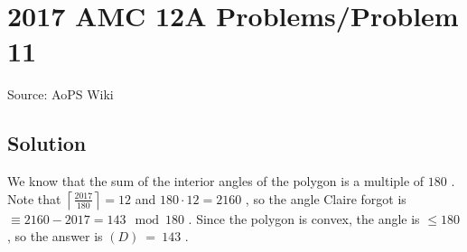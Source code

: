\documentclass[12pt]{article}
\begin{document}
\section*{{2017 AMC 12A Problems/Problem 11}}
Source: AoPS Wiki

\subsection*{Solution}
We know that the sum of the interior angles of the polygon is a multiple of $180$ . Note that $\left\lceil\frac{2017}{180}\right\rceil = 12$ and $180\cdot 12 = 2160$ , so the angle Claire forgot is $\equiv 2160-2017=143\mod 180$ . Since the polygon is convex, the angle is $\leq 180$ , so the answer is $\boxed{(D)\ =\ 143}$ .
\end{document}
